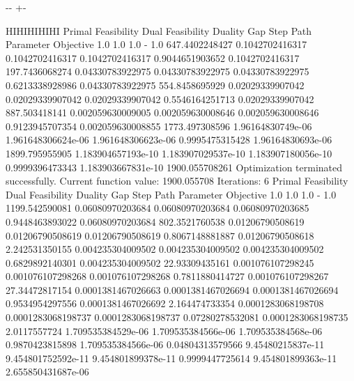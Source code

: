 \documentclass[letterpaper,10pt,english]{sphinxmanual}
\newlength\nbsphinxcodecellspacing
\begin{document}
{

\kern-\sphinxverbatimsmallskipamount\kern-\baselineskip
\kern+\FrameHeightAdjust\kern-\fboxrule
\vspace{\nbsphinxcodecellspacing}

\begin{sphinxVerbatim}[commandchars=\\\{\}]
HIHIHIHIHI
Primal Feasibility  Dual Feasibility    Duality Gap         Step             Path Parameter      Objective
1.0                 1.0                 1.0                 -                1.0                 647.4402248427
0.1042702416317     0.1042702416317     0.1042702416317     0.9044651903652  0.1042702416317     197.7436068274
0.04330783922975    0.04330783922975    0.04330783922975    0.6213338928986  0.04330783922975    554.8458695929
0.02029339907042    0.02029339907042    0.02029339907042    0.5546164251713  0.02029339907042    887.503418141
0.002059630009005   0.002059630008646   0.002059630008646   0.9123945707354  0.002059630008855   1773.497308596
1.96164830749e-06   1.961648306624e-06  1.961648306623e-06  0.9995475315428  1.96164830693e-06   1899.795955905
1.183904657193e-10  1.183907029537e-10  1.183907180056e-10  0.9999396473343  1.183903667831e-10  1900.055708261
Optimization terminated successfully.
         Current function value: 1900.055708
         Iterations: 6
Primal Feasibility  Dual Feasibility    Duality Gap         Step             Path Parameter      Objective
1.0                 1.0                 1.0                 -                1.0                 1199.542590081
0.06080970203684    0.06080970203684    0.06080970203685    0.9448463893022  0.06080970203684    802.3521760538
0.01206790508619    0.01206790508619    0.01206790508619    0.8067148881887  0.01206790508618    2.242531350155
0.004235304009502   0.004235304009502   0.004235304009502   0.6829892140301  0.004235304009502   22.93309435161
0.001076107298245   0.001076107298268   0.001076107298268   0.7811880414727  0.001076107298267   27.34472817154
0.0001381467026663  0.0001381467026694  0.0001381467026694  0.9534954297556  0.0001381467026692  2.164474733354
0.0001283068198708  0.0001283068198737  0.0001283068198737  0.07280278532081 0.0001283068198735  2.0117557724
1.709535384529e-06  1.709535384566e-06  1.709535384568e-06  0.9870423815898  1.709535384566e-06  0.04804313579566
9.45480215837e-11   9.454801752592e-11  9.454801899378e-11  0.9999447725614  9.454801899363e-11  2.655850431687e-06

\end{sphinxVerbatim}}
\end{document}
